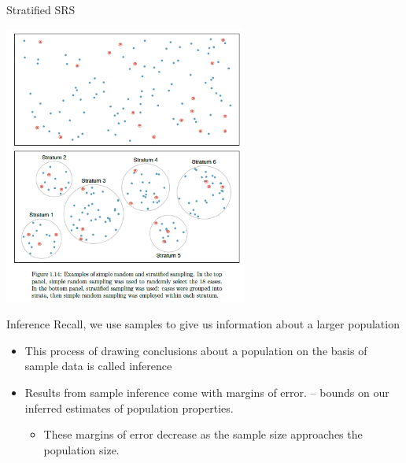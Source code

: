 \documentclass{beamer}
\begin{document}
\begin{frame}{Stratified SRS}
	\begin{center}
		\includegraphics[width=0.6\textwidth]{stratified}
		
	\end{center}
\end{frame}


\begin{frame}{Inference}
	Recall, we use samples to give us information about a larger population
	\begin{itemize}
		\item This process of drawing conclusions about a population on the basis of sample data is called \alert{inference}
		\item Results from sample inference come with \alert{margins of error}. -- bounds on our inferred estimates of population properties. 
		      \begin{itemize}
		      	\item These margins of error decrease as the sample size approaches the population size.
		      \end{itemize}
	\end{itemize}
\end{frame}
\end{document}
